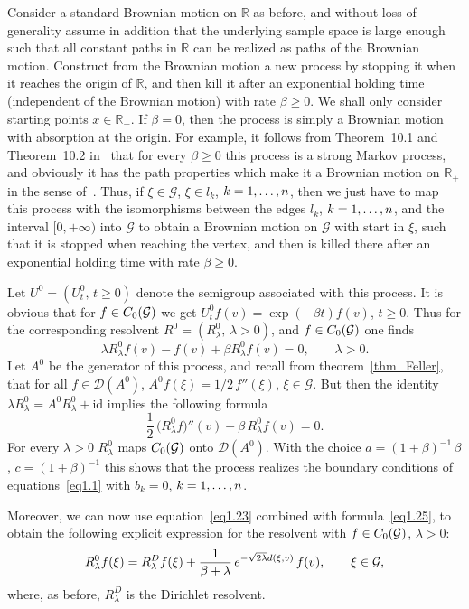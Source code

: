 \documentclass[11pt,a4paper]{amsart}
\newcommand{\gb}{\beta}
\newcommand{\gl}{\lambda}
\newcommand{\cD}{\mathcal{D}}
\newcommand{\cG}{\mathcal{G}}
\newcommand{\1}{1}
\newcommand{\R}{\mathbb{R}}
\theoremstyle{remark}
\newcommand{\sgl}{\ensuremath\sqrt{2\gl}}
\newcommand{\Co}{\ensuremath C_0(\cG)}
\newcommand{\kn}{\ensuremath k=1,\dotsc,n}
\numberwithin{equation}{section}
\begin{document}
Consider a standard Brownian motion on $\R$ as before, and without loss of
generality assume in addition that the underlying sample space is large enough such
that all constant paths in $\R$ can be realized as paths of the Brownian motion.
Construct from  the Brownian motion a new process by stopping it when it reaches the
origin of $\R$, and then kill it after an exponential holding time (independent of
the Brownian motion) with rate $\gb\ge 0$. We shall only consider starting points
$x\in\R_+$. If $\gb=0$, then the process is simply a Brownian motion with absorption
at the origin. For example, it follows from Theorem~10.1 and Theorem~10.2
in~\cite{Dy65a} that for every $\gb\ge 0$ this process is a strong Markov process,
and obviously it has the path properties which make it a Brownian motion on $\R_+$
in the sense of~\cite[Section~6.1]{Kn81}. Thus, if $\xi\in\cG$, $\xi\in l_k$, $\kn$,
then we just have to map this process with the isomorphisms between the edges $l_k$,
$\kn$, and the interval $[0,+\infty)$ into $\cG$ to obtain a Brownian motion on
$\cG$ with start in $\xi$, such that it is stopped when reaching the vertex, and
then is killed there after an exponential holding time with rate $\gb\ge 0$.

Let $U^0=(U^0_t,\,t\ge 0)$ denote the semigroup associated with this process. It is
obvious that for $f\in \Co$ we get $U^0_t f(v) = \exp(-\gb t) f(v)$, $t\ge 0$. Thus
for the corresponding resolvent $R^0=(R^0_\gl,\,\gl>0)$, and $f\in\Co$ one finds
\begin{equation}    \label{eq1.25}
    \gl R^0_\gl f(v) - f(v) + \gb R^0_\gl f(v) = 0,\qquad \gl>0.
\end{equation}
Let $A^0$ be the generator of this process, and recall from theorem~\ref{thm_Feller},
that for all $f\in\cD(A^0)$, $A^0 f(\xi) = 1/2\, f''(\xi)$, $\xi\in\cG$. But then the
identity $\gl R^0_\gl = A^0 R^0_\gl + \text{id}$ implies the following formula
\begin{equation*}
    \frac{1}{2}\,\bigl(R^0_\gl f\bigr)''(v) + \gb\,R^0_\gl f(v) = 0.
\end{equation*}
For every $\gl>0$ $R^0_\gl$ maps $\Co$ onto $\cD(A^0)$. With
the choice $a = (1+\gb)^{-1}\,\gb$, $c = (1+\gb)^{-1}$ this shows that the process
realizes the boundary conditions of equations~\eqref{eq1.1} with $b_k=0$, $\kn$.

Moreover, we can now use equation~\eqref{eq1.23} combined with formula~\eqref{eq1.25}, to
obtain the following explicit expression for the resolvent with $f\in\Co$, $\gl>0$:
\begin{equation}    \label{eq1.26}
    R^0_\gl f(\xi) = R^D_\gl f(\xi) + \frac{1}{\gb+\gl}\,e^{-\sgl d(\xi,v)}\,f(v),
                    \qquad \xi\in\cG,
\end{equation}
where, as before, $R^D_\gl$ is the Dirichlet resolvent.
\end{document}

